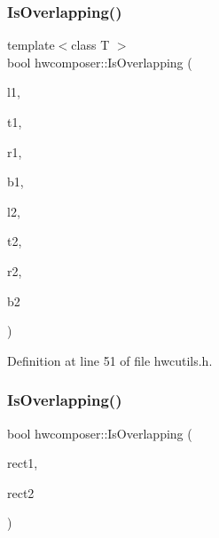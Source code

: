 \subsubsection{\texorpdfstring{Is\+Overlapping()}{IsOverlapping()}\hspace{0.1cm}{\footnotesize\ttfamily [1/2]}}
{\footnotesize\ttfamily template$<$class T $>$ \\
bool hwcomposer\+::\+Is\+Overlapping (\begin{DoxyParamCaption}\item[{T}]{l1,  }\item[{T}]{t1,  }\item[{T}]{r1,  }\item[{T}]{b1,  }\item[{T}]{l2,  }\item[{T}]{t2,  }\item[{T}]{r2,  }\item[{T}]{b2 }\end{DoxyParamCaption})\hspace{0.3cm}{\ttfamily [inline]}}



Definition at line 51 of file hwcutils.\+h.


\begin{DoxyCode}{0}
\end{DoxyCode}
\mbox{\label{namespacehwcomposer_a85ee8afdfd9f51ed3dc5bae812bd6876}} 
\subsubsection{\texorpdfstring{Is\+Overlapping()}{IsOverlapping()}\hspace{0.1cm}{\footnotesize\ttfamily [2/2]}}
{\footnotesize\ttfamily bool hwcomposer\+::\+Is\+Overlapping (\begin{DoxyParamCaption}\item[{const hwcomposer\+::\+Hwc\+Rect$<$ int $>$ \&}]{rect1,  }\item[{const hwcomposer\+::\+Hwc\+Rect$<$ int $>$ \&}]{rect2 }\end{DoxyParamCaption})\hspace{0.3cm}{\ttfamily [inline]}}




